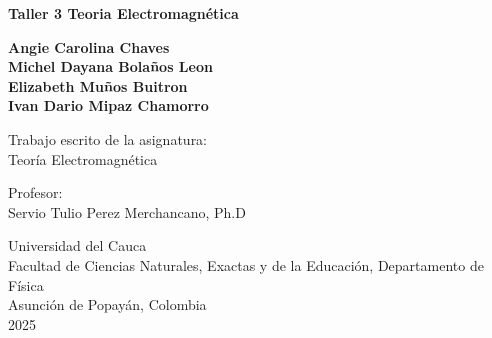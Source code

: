 \begin{titlepage}

    \begin{center}

        {\fontsize{18}{18}\selectfont \textbf{{Taller 3 Teoria Electromagnética }}}
            
        \vfill

        {\textbf{Angie Carolina Chaves\\
        Michel Dayana Bolaños Leon\\
        Elizabeth Muños Buitron\\
        Ivan Dario Mipaz Chamorro\\}
        }
               
        \vfill
        
        {Trabajo  escrito de la asignatura:}\\
        {Teoría Electromagnética}
        
        \vfill
        
        {Profesor:}\\
        {Servio Tulio Perez Merchancano}, {Ph.D}

        
        \vfill

        {Universidad del Cauca}\\
        {Facultad de Ciencias Naturales, Exactas y de la Educación, Departamento de Física}\\
        {Asunción de Popayán, Colombia}\\
        {2025}
        
        \end{center}

\end{titlepage}
